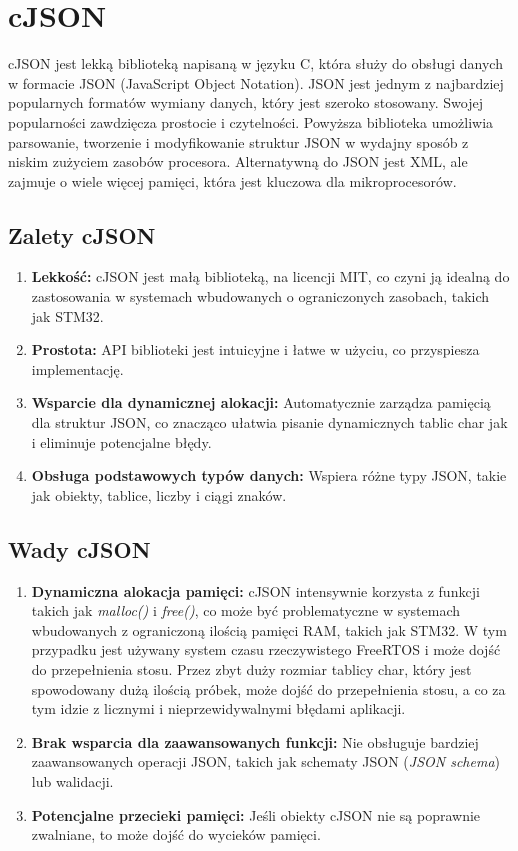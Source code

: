 \section{cJSON}
\label{section:cJSON}
cJSON \cite{cJSON} jest lekką biblioteką napisaną w języku C, która służy do obsługi danych w formacie JSON (JavaScript Object Notation). JSON jest jednym z najbardziej popularnych formatów wymiany danych, który jest szeroko stosowany. Swojej popularności zawdzięcza prostocie i czytelności. Powyższa biblioteka umożliwia parsowanie, tworzenie i modyfikowanie struktur JSON w wydajny sposób z niskim zużyciem zasobów procesora. Alternatywną do JSON jest XML, ale zajmuje o wiele więcej pamięci, która jest kluczowa dla mikroprocesorów.
\subsection{Zalety cJSON}
\begin{enumerate}
    \item \textbf{Lekkość:} cJSON jest małą biblioteką, na licencji MIT, co czyni ją idealną do zastosowania w systemach wbudowanych o ograniczonych zasobach, takich jak STM32.
    \item \textbf{Prostota:} API biblioteki jest intuicyjne i łatwe w użyciu, co przyspiesza implementację.
    \item \textbf{Wsparcie dla dynamicznej alokacji:} Automatycznie zarządza pamięcią dla struktur JSON, co znacząco ułatwia pisanie dynamicznych tablic char jak i eliminuje potencjalne błędy.
    \item \textbf{Obsługa podstawowych typów danych:} Wspiera różne typy JSON, takie jak obiekty, tablice, liczby i ciągi znaków.
\end{enumerate}
\subsection{Wady cJSON}
\begin{enumerate}
    \item \textbf{Dynamiczna alokacja pamięci:} cJSON intensywnie korzysta z funkcji takich jak \textit{malloc()} i \textit{free()}, co może być problematyczne w systemach wbudowanych z ograniczoną ilością pamięci RAM, takich jak STM32. W tym przypadku jest używany system czasu rzeczywistego FreeRTOS i może dojść do przepełnienia stosu. Przez zbyt duży rozmiar tablicy char, który jest spowodowany dużą ilością próbek, może dojść do przepełnienia stosu, a co za tym idzie z licznymi i nieprzewidywalnymi błędami aplikacji.
    \item \textbf{Brak wsparcia dla zaawansowanych funkcji:} Nie obsługuje bardziej zaawansowanych operacji JSON, takich jak schematy JSON (\textit{JSON schema}) lub walidacji.
    \item \textbf{Potencjalne przecieki pamięci:} Jeśli obiekty cJSON nie są poprawnie zwalniane, to może dojść do wycieków pamięci.
\end{enumerate}
